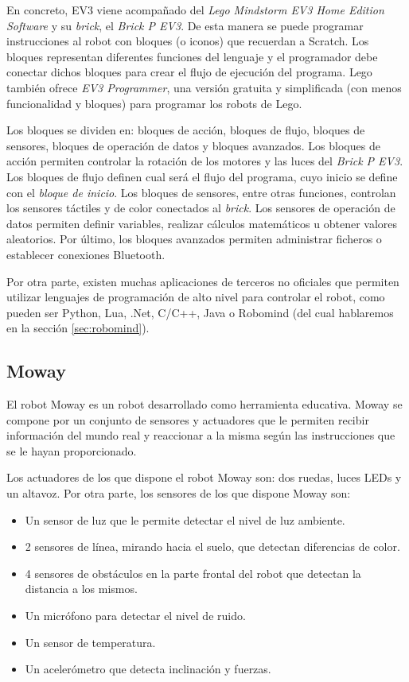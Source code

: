 En concreto, EV3 viene acompañado del \emph{Lego Mindstorm EV3 Home Edition Software} y su \emph{brick}, el \emph{Brick P EV3}. De esta manera se puede programar instrucciones al robot con bloques (o iconos) que recuerdan a Scratch. Los bloques representan diferentes funciones del lenguaje y el programador debe conectar dichos bloques para crear el flujo de ejecución del programa. Lego también ofrece \emph{EV3 Programmer}, una versión gratuita y simplificada (con menos funcionalidad y bloques) para programar los robots de Lego.

Los bloques se dividen en: bloques de acción, bloques de flujo, bloques de sensores, bloques de operación de datos y bloques avanzados. 
Los bloques de acción permiten controlar la rotación de los motores y las luces del \emph{Brick P EV3}. Los bloques de flujo definen cual será el flujo del programa, cuyo inicio se define con el \emph{bloque de inicio}. Los bloques de sensores, entre otras funciones, controlan los sensores táctiles y de color conectados al \emph{brick}. Los sensores de operación de datos permiten definir variables, realizar cálculos matemáticos u obtener valores aleatorios. Por último, los bloques avanzados permiten administrar ficheros o establecer conexiones Bluetooth.

Por otra parte, existen muchas aplicaciones de terceros no oficiales que permiten utilizar lenguajes de programación de alto nivel para controlar el robot, como pueden ser Python, Lua, .Net, C/C++, Java o Robomind (del cual hablaremos en la sección \ref{sec:robomind}).


\subsection{Moway}
\label{sec:moway}


El robot Moway\cite{moway} es un robot desarrollado como herramienta educativa. Moway se compone por un conjunto de sensores y actuadores que le permiten recibir información del mundo real y reaccionar a la misma según las instrucciones que se le hayan proporcionado.

Los actuadores de los que dispone el robot Moway son: dos ruedas, luces LEDs y un altavoz. Por otra parte, los sensores de los que dispone Moway son:
 
\begin{itemize}
	\item Un sensor de luz que le permite detectar el nivel de luz ambiente. 
	\item 2 sensores de línea, mirando hacia el suelo, que detectan diferencias de color.
	\item 4 sensores de obstáculos en la parte frontal del robot que detectan la distancia a los mismos.
	\item Un micrófono para detectar el nivel de ruido.
	\item Un sensor de temperatura. 
	\item Un acelerómetro que detecta inclinación y fuerzas.
\end{itemize}

